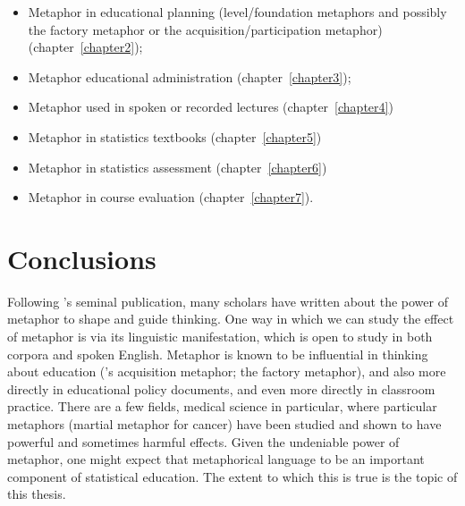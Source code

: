 \begin{itemize}
\item Metaphor in educational planning (level/foundation metaphors and
  possibly the factory metaphor or the acquisition/participation
  metaphor) (chapter~\ref{chapter2});
\item Metaphor educational administration (chapter~\ref{chapter3});
\item Metaphor used in spoken or recorded lectures (chapter~\ref{chapter4})
\item Metaphor in statistics textbooks (chapter~\ref{chapter5})
\item Metaphor in statistics assessment (chapter~\ref{chapter6})
\item Metaphor in course evaluation (chapter~\ref{chapter7}).
\end{itemize}


\section{Conclusions}

Following \citeauthor{lakoff1980}'s seminal publication, many scholars
have written about the power of metaphor to shape and guide thinking.
One way in which we can study the effect of metaphor is via its
linguistic manifestation, which is open to study in both corpora and
spoken English.  Metaphor is known to be influential in thinking about
education (\cite{sfard1998}'s acquisition metaphor; the factory
metaphor), and also more directly in educational policy documents, and
even more directly in classroom practice.  There are a few fields,
medical science in particular, where particular metaphors (martial
metaphor for cancer) have been studied and shown to have powerful and
sometimes harmful effects.  Given the undeniable power of metaphor,
one might expect that metaphorical language to be an important
component of statistical education.  The extent to which this is true
is the topic of this thesis.

